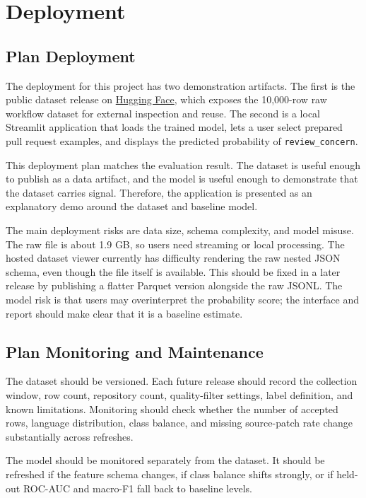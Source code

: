 \section{Deployment}

\subsection{Plan Deployment}

The deployment for this project has two demonstration artifacts. The first is the public dataset release on \href{https://huggingface.co/datasets/bulatSharif/gh-pr-issue-traces-10k}{Hugging Face}, which exposes the 10,000-row raw workflow dataset for external inspection and reuse. The second is a local Streamlit application that loads the trained model, lets a user select prepared pull request examples, and displays the predicted probability of \texttt{review\_concern}.

This deployment plan matches the evaluation result. The dataset is useful enough to publish as a data artifact, and the model is useful enough to demonstrate that the dataset carries signal. Therefore, the application is presented as an explanatory demo around the dataset and baseline model.

The main deployment risks are data size, schema complexity, and model misuse. The raw file is about 1.9 GB, so users need streaming or local processing. The hosted dataset viewer currently has difficulty rendering the raw nested JSON schema, even though the file itself is available. This should be fixed in a later release by publishing a flatter Parquet version alongside the raw JSONL. The model risk is that users may overinterpret the probability score; the interface and report should make clear that it is a baseline estimate.

\subsection{Plan Monitoring and Maintenance}

The dataset should be versioned. Each future release should record the collection window, row count, repository count, quality-filter settings, label definition, and known limitations. Monitoring should check whether the number of accepted rows, language distribution, class balance, and missing source-patch rate change substantially across refreshes.

The model should be monitored separately from the dataset. It should be refreshed if the feature schema changes, if class balance shifts strongly, or if held-out ROC-AUC and macro-F1 fall back to baseline levels.

